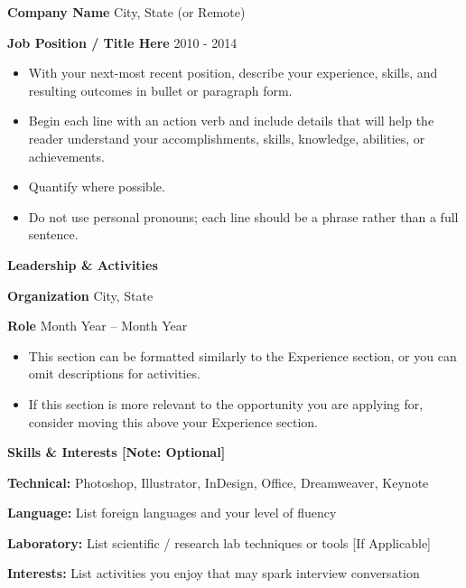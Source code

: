 \documentclass[11pt]{article}
\begin{document}
\vspace{12pt}

\textbf{Company Name} \hfill City, State (or Remote)

\textbf{Job Position / Title Here} \hfill 2010 - 2014
\begin{itemize}[noitemsep, topsep=0pt, partopsep=0pt, parsep=0pt]
    \item With your next-most recent position, describe your experience, skills, and resulting outcomes in bullet or paragraph form.
    \item Begin each line with an action verb and include details that will help the reader understand your accomplishments, skills, knowledge, abilities, or achievements.
    \item Quantify where possible.
    \item Do not use personal pronouns; each line should be a phrase rather than a full sentence.
\end{itemize}

\begin{center}
    \textbf{Leadership \& Activities}
\end{center}

\textbf{Organization}	\hfill City, State

\textbf{Role} \hfill Month Year – Month Year
\begin{itemize}[noitemsep, topsep=0pt, partopsep=0pt, parsep=0pt]
    \item This section can be formatted similarly to the Experience section, or you can omit descriptions for activities.
    \item If this section is more relevant to the opportunity you are applying for, consider moving this above your Experience section.
\end{itemize}

\begin{center}
    \textbf{Skills \& Interests [Note: Optional]}
\end{center}

\textbf{Technical:} Photoshop, Illustrator, InDesign, Office, Dreamweaver, Keynote

\textbf{Language:} List foreign languages and your level of fluency

\textbf{Laboratory:} List scientific / research lab techniques or tools [If Applicable]

\textbf{Interests:} List activities you enjoy that may spark interview conversation
\end{document}
